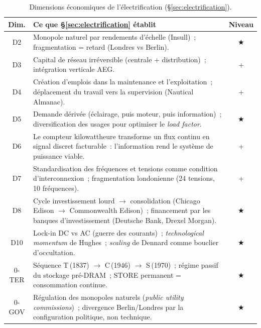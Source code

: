 \begin{table}[htbp]
\caption{Dimensions économiques de l'électrification (§\ref{sec:electrification}).}\label{tab:electrification-dimensions}
\centering\small
\renewcommand{\arraystretch}{1.15}
\begin{tabularx}{\textwidth}{@{}cXc@{}}
\toprule
\textbf{Dim.} & \textbf{Ce que §\ref{sec:electrification} établit} & \textbf{Niveau} \\
\midrule
D2 & Monopole naturel par rendements d'échelle (Insull)~; fragmentation = retard (Londres vs Berlin). & ★ \\
D3 & Capital de réseau irréversible (centrale + distribution)~; intégration verticale AEG. & + \\
D4 & Création d'emplois dans la maintenance et l'exploitation~; déplacement du travail vers la supervision (Nautical Almanac). & + \\
D5 & Demande dérivée (éclairage, puis moteur, puis information)~; diversification des usages pour optimiser le \emph{load factor}. & ★ \\
D6 & Le compteur kilowattheure transforme un flux continu en signal discret facturable~: l'information rend le système de puissance viable. & + \\
D7 & Standardisation des fréquences et tensions comme condition d'interconnexion~; fragmentation londonienne (24 tensions, 10 fréquences). & + \\
D8 & Cycle investissement lourd $\rightarrow$ consolidation (Chicago Edison $\rightarrow$ Commonwealth Edison)~; financement par les banques d'investissement (Deutsche Bank, Drexel Morgan). & ★ \\
D10 & Lock-in DC vs AC (guerre des courants)~; \emph{technological momentum} de Hughes~; \emph{scaling} de Dennard comme bouclier d'occultation. & ★ \\
\midrule
0-TER & Séquence T\,(1837) $\rightarrow$ C\,(1946) $\rightarrow$ S\,(1970)~; régime passif du stockage pré-DRAM~; STORE permanent = consommation continue. & ★ \\
0-GOV & Régulation des monopoles naturels (\emph{public utility commissions})~; divergence Berlin/Londres par la configuration politique, non technique. & ★ \\
\bottomrule
\end{tabularx}
\renewcommand{\arraystretch}{1.0}
\end{table}


